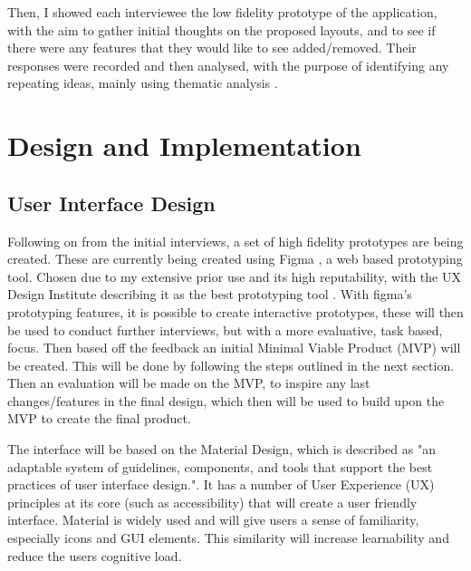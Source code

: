 \documentclass [11pt,a4paper]{article}
\begin{document}
Then, I showed each interviewee the low fidelity prototype of the application, with the aim to gather initial thoughts on the proposed layouts, and to see if there were any features that they would like to see added/removed. Their responses were recorded and then analysed, with the purpose of identifying any repeating ideas, mainly using thematic analysis \cite{thematicAnal}.

\section{Design and Implementation}
\label{sec:design}
\subsection{User Interface Design}
\label{sec:ui_design}
Following on from the initial interviews, a set of high fidelity prototypes are being created. These are currently being created using Figma \cite{figma}, a web based prototyping tool. Chosen due to my extensive prior use and its high reputability, with the UX Design Institute describing it as the best prototyping tool \cite{figmaUX}. With figma's prototyping features, it is possible to create interactive prototypes, these will then be used to conduct further interviews, but with a more evaluative, task based, focus. Then based off the feedback an initial Minimal Viable Product (MVP) will be created. This will be done by following the steps outlined in the next section. Then an evaluation will be made on the MVP, to inspire any last changes/features in the final design, which then will be used to build upon the MVP to create the final product.

The interface will be based on the Material Design, which is described as "an adaptable system of guidelines, components, and tools that support the best practices of user interface design."\cite{materialDesign}. It has a number of User Experience (UX) principles at its core (such as accessibility) that will create a user friendly interface. Material is widely used and will give users a sense of familiarity, especially icons and GUI elements. This similarity will increase learnability and reduce the users cognitive load.
\end{document}
